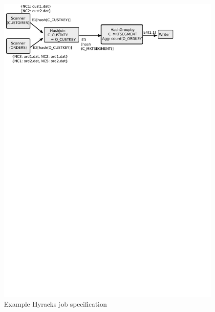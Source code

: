 \vspace{-2mm}
\begin{figure}[htp]
\centering
\includegraphics[scale=0.8]{images/tpch-jobspec}
\caption{Example Hyracks job specification}\label{fig:example01_spec}
\end{figure}
\vspace{-2mm}

